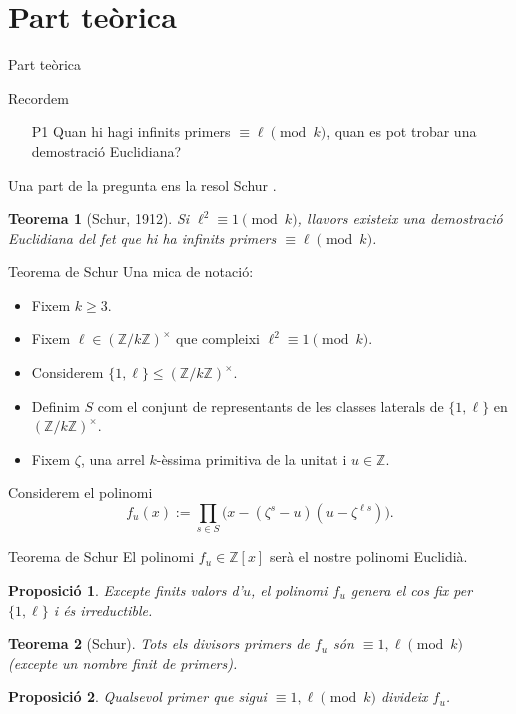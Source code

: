 \documentclass[11pt]{beamer}
\newtheorem{thm}{Teorema}
\newtheorem{prop}{Proposició}
\newcommand{\Z}{\ensuremath{\mathbb{Z}}}
\begin{document}
	\section{Part teòrica}
\begin{frame}{Part teòrica}
	\begin{alertblock}{Recordem}
		\begin{itemize}
			\item[P1] Quan hi hagi infinits primers $\equiv\ell\pmod{k}$, quan es pot trobar una demostració Euclidiana? \pause
		\end{itemize}
	\end{alertblock}
	\vspace{0.25cm}
	Una part de la pregunta ens la resol Schur \cite{Murty}.
	\vspace{0.25cm}
	\begin{thm}[Schur, 1912]
		Si $\ell^2\equiv 1\pmod{k}$, llavors existeix una demostració Euclidiana del fet que hi ha infinits primers $\equiv \ell\pmod{k}$.
	\end{thm}
\end{frame}

	\begin{frame}{Teorema de Schur}
		Una mica de notació:
		\begin{itemize}
			\item Fixem $k\geqslant 3$. \pause
			\item Fixem $\ell\in (\Z/k\Z)^\times$ que compleixi $\ell^2\equiv 1\pmod{k}$.\pause
			\item Considerem $\{1,\ell\}\leqslant (\Z/k\Z)^\times$.\pause
			\item Definim $S$ com el conjunt de representants de les classes laterals de $\{1,\ell\}$ en $(\Z/k\Z)^\times$.\pause
			\item Fixem $\zeta$, una arrel $k$-èssima primitiva de la unitat i $u\in\Z$.\newline \pause
		\end{itemize}
		Considerem el polinomi
		\begin{equation*}
			f_u(x):=\prod_{s\in S}\big(x-(\zeta^s-u)(u-\zeta^{\ell s})\big).
		\end{equation*}
	\end{frame}
	
	\begin{frame}{Teorema de Schur}
		El polinomi $f_u\in \Z[x]$ serà el nostre polinomi Euclidià.
		\begin{prop}
			Excepte finits valors d'$u$, el polinomi $f_u$ genera el cos fix per $\{1,\ell\}$ i és irreductible.
		\end{prop}\pause
		\begin{thm}[Schur]
			Tots els divisors primers de $f_u$ són $\equiv 1,\ell\pmod{k}$ (excepte un nombre finit de primers).
		\end{thm}
		\pause
		\begin{prop}
			Qualsevol primer que sigui $\equiv 1,\ell\pmod{k}$ divideix $f_u$.
		\end{prop}
	\end{frame}
	
\end{document}
